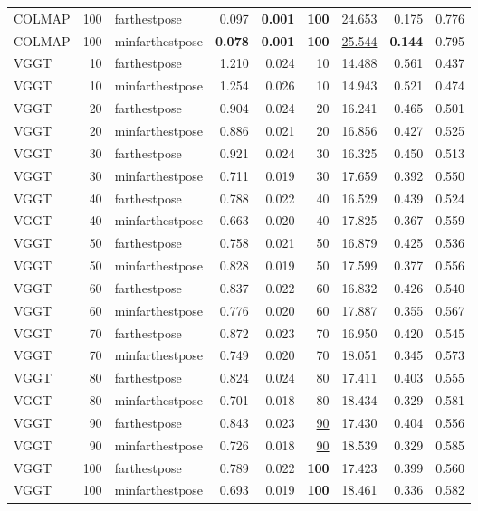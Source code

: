 \begin{table}[H]
\begin{tabular}{lrlrrrrrr}
COLMAP & 100 & farthestpose & 0.097 & \textbf{0.001} & \textbf{100} & 24.653 & 0.175 & 0.776 \\
COLMAP & 100 & minfarthestpose & \textbf{0.078} & \textbf{0.001} & \textbf{100} & \underline{25.544} & \textbf{0.144} & 0.795 \\
VGGT & 10 & farthestpose & 1.210 & 0.024 & 10 & 14.488 & 0.561 & 0.437 \\
VGGT & 10 & minfarthestpose & 1.254 & 0.026 & 10 & 14.943 & 0.521 & 0.474 \\
VGGT & 20 & farthestpose & 0.904 & 0.024 & 20 & 16.241 & 0.465 & 0.501 \\
VGGT & 20 & minfarthestpose & 0.886 & 0.021 & 20 & 16.856 & 0.427 & 0.525 \\
VGGT & 30 & farthestpose & 0.921 & 0.024 & 30 & 16.325 & 0.450 & 0.513 \\
VGGT & 30 & minfarthestpose & 0.711 & 0.019 & 30 & 17.659 & 0.392 & 0.550 \\
VGGT & 40 & farthestpose & 0.788 & 0.022 & 40 & 16.529 & 0.439 & 0.524 \\
VGGT & 40 & minfarthestpose & 0.663 & 0.020 & 40 & 17.825 & 0.367 & 0.559 \\
VGGT & 50 & farthestpose & 0.758 & 0.021 & 50 & 16.879 & 0.425 & 0.536 \\
VGGT & 50 & minfarthestpose & 0.828 & 0.019 & 50 & 17.599 & 0.377 & 0.556 \\
VGGT & 60 & farthestpose & 0.837 & 0.022 & 60 & 16.832 & 0.426 & 0.540 \\
VGGT & 60 & minfarthestpose & 0.776 & 0.020 & 60 & 17.887 & 0.355 & 0.567 \\
VGGT & 70 & farthestpose & 0.872 & 0.023 & 70 & 16.950 & 0.420 & 0.545 \\
VGGT & 70 & minfarthestpose & 0.749 & 0.020 & 70 & 18.051 & 0.345 & 0.573 \\
VGGT & 80 & farthestpose & 0.824 & 0.024 & 80 & 17.411 & 0.403 & 0.555 \\
VGGT & 80 & minfarthestpose & 0.701 & 0.018 & 80 & 18.434 & 0.329 & 0.581 \\
VGGT & 90 & farthestpose & 0.843 & 0.023 & \underline{90} & 17.430 & 0.404 & 0.556 \\
VGGT & 90 & minfarthestpose & 0.726 & 0.018 & \underline{90} & 18.539 & 0.329 & 0.585 \\
VGGT & 100 & farthestpose & 0.789 & 0.022 & \textbf{100} & 17.423 & 0.399 & 0.560 \\
VGGT & 100 & minfarthestpose & 0.693 & 0.019 & \textbf{100} & 18.461 & 0.336 & 0.582 \\
\bottomrule
\end{tabular}
\end{table}